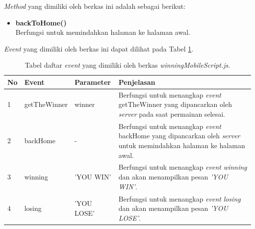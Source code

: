 \begin{enumerate}
\begin{enumerate}
\begin{enumerate}
			\textit{Method} yang dimiliki oleh berkas ini adalah sebagai berikut:
			\begin{itemize}
				\item \textbf{backToHome()} \\
				Berfungsi untuk memindahkan halaman ke halaman awal.
			\end{itemize}
			
			\textit{Event} yang dimiliki oleh berkas ini dapat dilihat pada Tabel \ref{table:event_winningMobileScript}.
			\begin{table}[H]
				\centering
				\caption{Tabel daftar \textit{event} yang dimiliki oleh berkas \textit{winningMobileScript.js}.}
				\begin{tabular}{|p{0.35cm}|p{3cm}|p{3cm}|p{7cm}|}
					\hline
					No & Event & Parameter & Penjelasan \\ \hline
					1 & getTheWinner & winner & Berfungsi untuk menangkap \textit{event} getTheWinner yang dipancarkan oleh \textit{server} pada saat permainan selesai. \\ \hline
					2 & backHome & - & Berfungsi untuk menangkap \textit{event} backHome yang dipancarkan oleh \textit{server} untuk memindahkan halaman ke halaman awal. \\ \hline
					3 & winning & 'YOU WIN' & Berfungsi untuk menangkap \textit{event} \textit{winning} dan akan menampilkan pesan \textit{'YOU WIN'}. \\ \hline
					4 & losing & 'YOU LOSE' & Berfungsi untuk menangkap \textit{event} \textit{losing} dan akan menampilkan pesan \textit{'YOU LOSE'}. \\ \hline
				\end{tabular}
				\label{table:event_winningMobileScript}
			\end{table}
%				
%				
%				

\end{enumerate}
\end{enumerate}
\end{enumerate}
